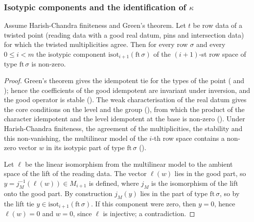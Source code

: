 \subsubsection{Isotypic components and the identification of \texorpdfstring{$\kappa$}{kappa}}\label{sec:pf:open0:kappa}

\begin{proposition}\label{pf:open0:isot}
Assume Harish-Chandra finiteness and Green's theorem. Let $t$ be row data of a twisted point (reading data with a good real datum,
pins and intersection data) for which the twisted multiplicities agree. Then for every row $\sigma$ and every $0\le i<m$ the
isotypic component $\mathrm{isot}_{i+1}(\mathrm{ft}\,\sigma)$ of the $(i+1)$-st row space of type $\mathrm{ft}\,\sigma$ is non-zero.
\ 
\end{proposition}

\begin{proof}
Green's theorem gives the idempotent tie for the types of the point
( and ); hence the coefficients of
the good idempotent are invariant under inversion, and the good operator is stable
(). The weak characterisation of the real datum gives the core
conditions on the level and the group (), from which the product of the character
idempotent and the level idempotent at the base is non-zero ().
Under Harish-Chandra finiteness, the agreement of the multiplicities, the stability and this non-vanishing, the multilinear model of
the $i$-th row space contains a non-zero vector $w$ in its isotypic part of type $\mathrm{ft}\,\sigma$
().

Let $\ell$ be the linear isomorphism from the multilinear model to the ambient space of the lift of the reading data. The vector
$\ell(w)$ lies in the good part, so $y=j_{M}^{-1}(\ell(w))\in M_{i+1}$ is defined, where $j_M$ is the isomorphism of the lift onto the good
part. By construction $j_M(y)$ lies in the part of type $\mathrm{ft}\,\sigma$, so by the lift tie
$y\in\mathrm{isot}_{i+1}(\mathrm{ft}\,\sigma)$. If this component were zero, then $y=0$, hence $\ell(w)=0$ and $w=0$, since $\ell$ is
injective; a contradiction.
\end{proof}

